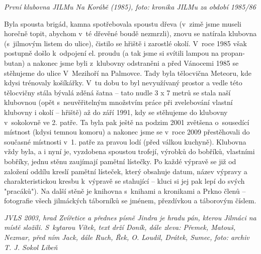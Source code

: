 \documentclass[a5paper, 12pt, twoside]{article}
\begin{document}

\textit{První klubovna JILMu Na Korábě (1985), foto: kronika JILMu za
období 1985/86}

Byla spousta brigád, kamna spotřebovala spoustu dřeva (v~zimě jsme
museli horečně topit, abychom v~té dřevěné boudě nezmrzli), znovu se
natírala klubovna (s~jilmovým listem do ulice), čistilo se hřiště i
zarostlé okolí. V~roce 1985 však postupně došlo k~odpojení el. proudu (a
tak jsme si svítili lampou na propan-butan) a nakonec jsme byli
z~klubovny odstraněni a před Vánocemi 1985 se stěhujeme do ulice
V~Mezihoří na Palmovce. Tady byla tělocvična Meteoru, kde kdysi trénovaly
košíkářky. V~tu dobu to byl nevyužívaný prostor a vedle této tělocvičny
stála bývalá zděná šatna -- tato nudle 3 x 7 metrů se stala naší
klubovnou (opět s~neuvěřitelným množstvím práce při zvelebování vlastní
klubovny i okolí -- hřiště) až do září 1991, kdy se stěhujeme do
klubovny v~sokolovně ve 2. patře. Ta byla pak ještě na podzim 2001
zvětšena o~sousedící místnost (kdysi temnou komoru) a nakonec jsme se
v~roce 2009 přestěhovali do současné místnosti v~1. patře za pravou lodí
(před válkou kuchyně). Klubovna vždy byla, a i nyní je, vyzdobena
spoustou trofejí, výrobků do bobříků, vlastními bobříky, jednu stěnu
zaujímají pamětní lístečky. Po každé výpravě se již od založení oddílu
kreslí pamětní lísteček, který obsahuje datum, název výpravy a
charakteristickou kresbu k~výpravě se stahující -- kluci si jej pak lepí
do svých "pracáků"). Na další stěně je knihovna s~knihami a kronikami a
Prkno členů -- fotografie všech jilmáckých táborníků se jménem,
přezdívkou a táborovým číslem.


\textit{JVLS 2003, hrad Zvířetice a přednes písně Jindra je hradu pán,
kterou Jilmáci na místě složili. S~kytarou Vítek, text drží Doník, dále
zleva: Přemek, Matouš, Nezmar, před ním Jack, dále Ruch, Řek, O. Loudil,
Drátek, Sumec, foto: archiv T. J. Sokol Libeň}
\end{document}
